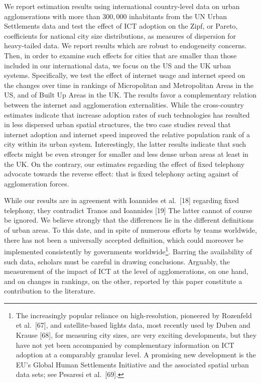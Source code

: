 \documentclass[10pt,letterpaper]{article}
\begin{document}
We report estimation results using international country-level data on
urban agglomerations with more than \(300,000\) inhabitants from the UN
Urban Settlements data and test the effect of ICT adoption on the Zipf,
or Pareto, coefficients for national city size distributions, as
measures of dispersion for heavy-tailed data. We report results which
are robust to endogeneity concerns. Then, in order to examine such
effects for cities that are smaller than those included in our
international data, we focus on the US and the UK urban systems.
Specifically, we test the effect of internet usage and internet speed on
the changes over time in rankings of Micropolitan and Metropolitan Areas
in the US, and of Built Up Areas in the UK. The results favor a
complementary relation between the internet and agglomeration
externalities. While the cross-country estimates indicate that increase
adoption rates of such technologies has resulted in less dispersed urban
spatial structures, the two case studies reveal that internet adoption
and internet speed improved the relative population rank of a city
within its urban system. Interestingly, the latter results indicate that
such effects might be even stronger for smaller and less dense urban
areas at least in the UK. On the contrary, our estimates regarding the
effect of fixed telephony advocate towards the reverse effect: that is
fixed telephony acting against of agglomeration forces.

While our results are in agreement with Ioannides et al.~{[}18{]}
regarding fixed telephony, they contradict Tranos and Ioannides {[}19{]}
The latter cannot of course be ignored. We believe strongly that the
differences lie in the different definitions of urban areas. To this
date, and in spite of numerous efforts by teams worldwide, there has not
been a universally accepted definition, which could moreover be
implemented consistently by governments worldwide\footnote{The
  increasingly popular reliance on high-resolution, pioneered by
  Rozenfeld et al.~{[}67{]}, and satellite-based lights data, most
  recently used by Duben and Krause {[}68{]}, for measuring city sizes,
  are very exciting developments, but they have not yet been accompanied
  by complementary information on ICT adoption at a comparably granular
  level. A promising new development is the EU's Global Human
  Settlements Initiative and the associated spatial urban data sets; see
  Pesaresi et al.~{[}69{]}.}. Barring the availability of such data,
scholars must be careful in drawing conclusions. Arguably, the
measurement of the impact of ICT at the level of agglomerations, on one
hand, and on changes in rankings, on the other, reported by this paper
constitute a contribution to the literature.
\end{document}

